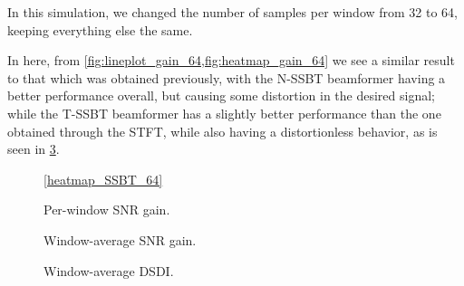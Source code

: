 In this simulation, we changed the number of samples per window from 32 to 64, keeping everything else the same.

In here, from \cref{fig:lineplot_gain_64,fig:heatmap_gain_64} we see a similar result to that which was obtained previously, with the N-SSBT beamformer having a better performance overall, but causing some distortion in the desired signal; while the T-SSBT beamformer has a slightly better performance than the one obtained through the STFT, while also having a distortionless behavior, as is seen in \cref{fig:lineplot_dsdi_64}.



\begin{figure}[H]
	\centering
	
	
	\vspace*{0.4em}
	\ref*{heatmap_SSBT_64}
	\caption{Per-window SNR gain.}
	\label{fig:heatmap_gain_64}
\end{figure}

\begin{figure}[H]
\centering

\caption{Window-average SNR gain.}
\label{fig:lineplot_gain_64}
\end{figure}

\begin{figure}[H]
	\centering
	
	\caption{Window-average DSDI.}
	\label{fig:lineplot_dsdi_64}
\end{figure}